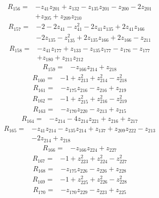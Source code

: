 \begin{align*}
R_{156}={}&-z_{41}z_{201}+z_{132}-z_{135}z_{201}-z_{200}-2z_{201}\\
&+z_{205}+z_{209}z_{210}
\end{align*}
\begin{align*}
R_{157}={}&-2-2z_{41}-z_{41}^{2}-2z_{41}z_{135}+2z_{41}z_{166}\\
&-2z_{135}-z_{135}^{2}+2z_{135}z_{166}+2z_{166}-z_{211}
\end{align*}
\begin{align*}
R_{158}={}&-z_{41}z_{177}+z_{133}-z_{135}z_{177}-z_{176}-z_{177}\\
&+z_{180}+z_{211}z_{212}
\end{align*}
\begin{align*}
R_{159}={}&-z_{166}z_{214}+z_{218}
\end{align*}
\begin{align*}
R_{160}={}&-1+z_{213}^{2}+z_{214}^{2}-z_{218}^{2}
\end{align*}
\begin{align*}
R_{161}={}&-z_{175}z_{216}-z_{216}+z_{219}
\end{align*}
\begin{align*}
R_{162}={}&-1+z_{215}^{2}+z_{216}^{2}-z_{219}^{2}
\end{align*}
\begin{align*}
R_{163}={}&-z_{170}z_{220}-z_{213}+z_{215}
\end{align*}
\begin{align*}
R_{164}={}&-z_{214}-4z_{214}z_{221}+z_{216}+z_{217}
\end{align*}
\begin{align*}
R_{165}={}&-z_{41}z_{214}-z_{135}z_{214}+z_{137}+z_{209}z_{222}-z_{213}\\
&-2z_{214}+z_{218}
\end{align*}
\begin{align*}
R_{166}={}&-z_{166}z_{224}+z_{227}
\end{align*}
\begin{align*}
R_{167}={}&-1+z_{223}^{2}+z_{224}^{2}-z_{227}^{2}
\end{align*}
\begin{align*}
R_{168}={}&-z_{175}z_{226}-z_{226}+z_{228}
\end{align*}
\begin{align*}
R_{169}={}&-1+z_{225}^{2}+z_{226}^{2}-z_{228}^{2}
\end{align*}
\begin{align*}
R_{170}={}&-z_{170}z_{229}-z_{223}+z_{225}
\end{align*}
